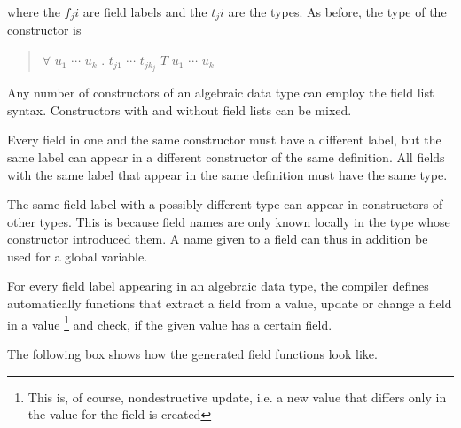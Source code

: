 where the $f_ji$ are field labels and the $t_ji$ are the types. 
As before, the type of the constructor is

\begin{quote}
$\forall$ $u_1$ $\cdots$ $u_k$ . $t_{j1}$ \arrow{} $\cdots$ \arrow{} $t_{jk_j}$ \arrow{} $T$ $u_1$ $\cdots$ $u_k$
\end{quote}

Any number of constructors of an algebraic data type can employ the field list syntax. 
Constructors with and without field lists can be mixed.

Every field in one and the same constructor must have a different label, but the same label can appear in a different constructor of the same  definition. 
All fields with the same label that appear in the same  definition must have the same type.

The same field label with a possibly different type can appear in constructors of other types. 
This is because field names are only known locally in the type whose constructor introduced them. 
A name given to a field can thus in addition be used for a global variable.

For every field label appearing in an algebraic data type, 
the compiler defines automatically functions that extract a field from a value,
update or change a field in a value
\footnote{This is, of course, nondestructive update, i.e. a new value that differs only in the value for the field is created} 
and check, if the given value has a certain field.


The following box shows how the generated field functions look like.

